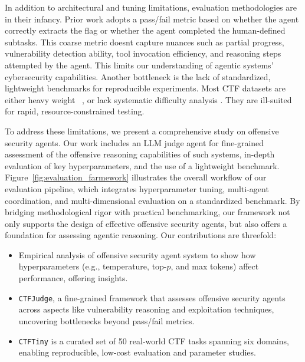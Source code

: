 
In addition to architectural and tuning limitations, evaluation methodologies are in their infancy. Prior work adopts a pass/fail  metric based on whether the agent correctly extracts the flag or whether the agent  completed the human-defined subtasks. This coarse metric doesnt capture nuances such as partial progress, vulnerability detection ability, tool invocation efficiency, and reasoning steps attempted by the agent. This limits our understanding of agentic systems’ cybersecurity capabilities.
Another bottleneck is the lack of standardized, lightweight benchmarks for reproducible experiments. Most CTF datasets are either heavy weight ~\cite{shao2024nyu,zhang2024cybenchframeworkevaluatingcybersecurity,bhatt2024cyberseceval}, or lack systematic difficulty analysis \cite{yang2023intercode}. They are ill-suited for rapid, resource-constrained testing. %

To address these limitations, we present a comprehensive study on offensive security agents. Our work includes an LLM judge agent for fine-grained assessment of the offensive reasoning capabilities of such systems, in-depth evaluation of key hyperparameters, and the use of a lightweight benchmark. Figure~\ref{fig:evaluation_farmework} illustrates the overall workflow of our evaluation pipeline, which integrates hyperparameter tuning, multi-agent coordination, and multi-dimensional evaluation on a standardized benchmark.
By bridging methodological rigor with practical benchmarking, our framework not only supports the design of effective offensive security agents, but also offers a foundation for assessing agentic reasoning. %
Our contributions are threefold:
\begin{itemize}
\item Empirical analysis of offensive security agent system to show how hyperparameters (e.g., temperature, top-$p$, and max tokens) affect performance, offering insights.
\item \texttt{CTFJudge}, a fine-grained framework that assesses offensive security agents across aspects like vulnerability reasoning and exploitation techniques, uncovering bottlenecks beyond pass/fail metrics.
\item \texttt{CTFTiny} is a curated set of 50 real-world CTF tasks spanning six domains, enabling reproducible, low-cost evaluation and parameter studies.
\end{itemize}


